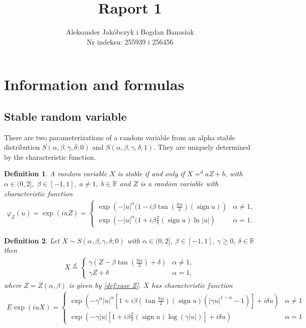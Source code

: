 \documentclass{article}
\title{Raport 1}
\author{Aleksander Jakóbczyk i Bogdan Banasiak\\ 
	Nr indeksu: 255939 i 256456}
\date{}\date{}
\newtheorem{definition}{Definition}
\DeclareMathOperator{\sign}{sign}
\begin{document}
	
	\maketitle
	\section{Information and formulas}
		\subsection*{Stable random variable}
		There are two parameterizations of a random variable from an alpha stable distribution $S(\alpha, \beta , \gamma, \delta; 0)$ and $S(\alpha, \beta , \gamma, \delta; 1)$.
		They are uniquely determined by the characteristic function.
		\begin{definition} A random variable $X$ is stable if and only if $X=^d aZ +b$, with \\$\alpha \in (0,2],\;\beta\in [-1,1],\; a\ne1,\; b\in\mathbb{R}$ and $Z$ is a random variable with characteristic function  
			\begin{gather}
				\varphi_Z(u) = \exp(i u Z) =
				\begin{cases}\label{def:case Z}
					\exp\left(- |u|^\alpha(1-i\beta\tan(\frac{\pi\alpha}{2})(\sign u)  \right) &\alpha \ne 1,\\
					\exp\left(- |u|^\alpha(1+i\beta\frac{2}{\pi}(\sign u)\ln|u|  \right) &\alpha = 1.
				\end{cases}
			\end{gather}
		\end{definition}
		\begin{definition} Let $X \sim S(\alpha, \beta , \gamma, \delta; 0)$ with $\alpha \in (0,2]$, $\beta \in [-1,1]$, $\gamma \ge 0$, $\delta\in\mathbb{R}$ then  
			\begin{gather*}
				X \stackrel{d}{=} 
				\begin{cases}
					\gamma (Z- \beta\tan(\frac{\pi\alpha}{2})+\delta)& \alpha\ne1,\\
					\gamma Z + \delta& \alpha=1,
				\end{cases}
			\end{gather*}
			where $Z = Z(\alpha,\beta)$ is given by \ref{def:case Z}. $X$ has characteristic function
			\begin{gather*}
				E \exp (i u X)= \begin{cases}
					\exp \left(-\gamma^\alpha|u|^\alpha\left[1+i \beta\left(\tan \frac{\pi \alpha}{2}\right)(\operatorname{sign} u)\left(|\gamma u|^{1-\alpha}-1\right)\right]+i \delta u\right) & \alpha \neq 1 \\ \exp \left(-\gamma|u|\left[1+i \beta \frac{2}{\pi}(\operatorname{sign} u) \log (\gamma|u|)\right]+i \delta u\right) & \alpha=1
				\end{cases}
			\end{gather*}
		\end{definition}
\end{document}
